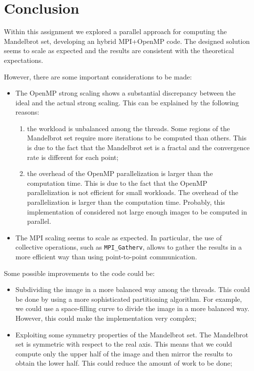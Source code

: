 \section{Conclusion}

Within this assignment we explored a parallel approach for computing the Mandelbrot set, developing an hybrid MPI+OpenMP code. The designed solution seems to scale as expected and the results are consistent with the theoretical expectations.

However, there are some important considerations to be made:
\begin{itemize}
    \item The OpenMP strong scaling shows a substantial discrepancy between the ideal and the actual strong scaling. This can be explained by the following reasons:
    \begin{enumerate}
        \item the workload is unbalanced among the threads. Some regions of the Mandelbrot set require more iterations to be computed than others. This is due to the fact that the Mandelbrot set is a fractal and the convergence rate is different for each point;
        \item the overhead of the OpenMP parallelization is larger than the computation time. This is due to the fact that the OpenMP parallelization is not efficient for small workloads. The overhead of the parallelization is larger than the computation time. Probably, this implementation of considered not large enough images to be computed in parallel.
    \end{enumerate}
    \item The MPI scaling seems to scale as expected. In particular, the use of collective operations, such as \texttt{MPI\_Gatherv}, allows to gather the results in a more efficient way than using point-to-point communication.
\end{itemize}

Some possible improvements to the code could be:
\begin{itemize}
    \item Subdividing the image in a more balanced way among the threads. This could be done by using a more sophisticated partitioning algorithm. For example, we could use a space-filling curve to divide the image in a more balanced way. However, this could make the implementation very complex;
    \item Exploiting some symmetry properties of the Mandelbrot set. The Mandelbrot set is symmetric with respect to the real axis. This means that we could compute only the upper half of the image and then mirror the results to obtain the lower half. This could reduce the amount of work to be done;
\end{itemize}
    
